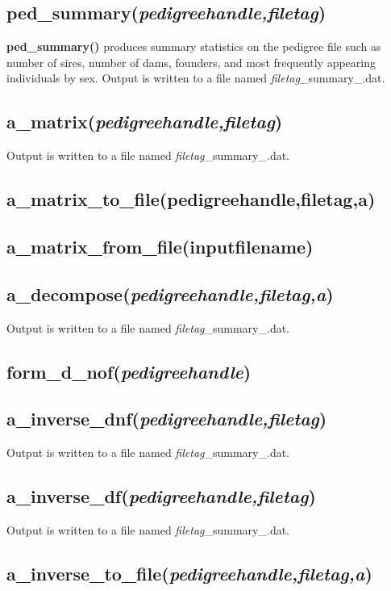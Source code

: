 \subsection{ped\_summary(\textit{pedigreehandle,filetag})}
\textbf{ped\_summary()} produces summary statistics on the pedigree file such as number of sires, number of dams, founders, and most frequently appearing individuals by sex.  Output is written to a file named \textit{filetag}\_summary\_.dat.

\subsection{a\_matrix(\textit{pedigreehandle,filetag})}
Output is written to a file named \textit{filetag}\_summary\_.dat.

\subsection{a\_matrix\_to\_file(pedigreehandle,filetag,a)}

\subsection{a\_matrix\_from\_file(inputfilename)}

\subsection{a\_decompose(\textit{pedigreehandle,filetag,a})}
Output is written to a file named \textit{filetag}\_summary\_.dat.

\subsection{form\_d\_nof(\textit{pedigreehandle})}

\subsection{a\_inverse\_dnf(\textit{pedigreehandle,filetag})}
Output is written to a file named \textit{filetag}\_summary\_.dat.

\subsection{a\_inverse\_df(\textit{pedigreehandle,filetag})}
Output is written to a file named \textit{filetag}\_summary\_.dat.

\subsection{a\_inverse\_to\_file(\textit{pedigreehandle,filetag,a})}

